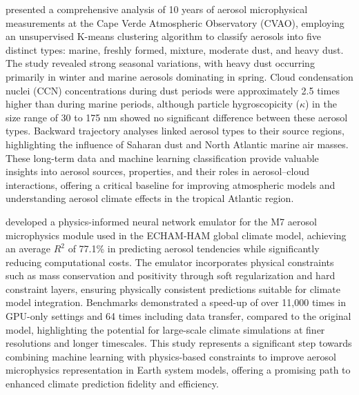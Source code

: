 \documentclass[11pt]{article}
\begin{document}
\citet{gong2022understanding} presented a comprehensive analysis of 10 years of aerosol microphysical measurements at the Cape Verde Atmospheric Observatory (CVAO), employing an unsupervised K-means clustering algorithm to classify aerosols into five distinct types: marine, freshly formed, mixture, moderate dust, and heavy dust. The study revealed strong seasonal variations, with heavy dust occurring primarily in winter and marine aerosols dominating in spring. Cloud condensation nuclei (CCN) concentrations during dust periods were approximately 2.5 times higher than during marine periods, although particle hygroscopicity (\(\kappa\)) in the size range of 30 to 175 nm showed no significant difference between these aerosol types. Backward trajectory analyses linked aerosol types to their source regions, highlighting the influence of Saharan dust and North Atlantic marine air masses. These long-term data and machine learning classification provide valuable insights into aerosol sources, properties, and their roles in aerosol–cloud interactions, offering a critical baseline for improving atmospheric models and understanding aerosol climate effects in the tropical Atlantic region.

\citet{harder2022physics} developed a physics-informed neural network emulator for the M7 aerosol microphysics module used in the ECHAM-HAM global climate model, achieving an average \( R^{2} \) of 77.1\% in predicting aerosol tendencies while significantly reducing computational costs. The emulator incorporates physical constraints such as mass conservation and positivity through soft regularization and hard constraint layers, ensuring physically consistent predictions suitable for climate model integration. Benchmarks demonstrated a speed-up of over 11,000 times in GPU-only settings and 64 times including data transfer, compared to the original model, highlighting the potential for large-scale climate simulations at finer resolutions and longer timescales. This study represents a significant step towards combining machine learning with physics-based constraints to improve aerosol microphysics representation in Earth system models, offering a promising path to enhanced climate prediction fidelity and efficiency.
\end{document}
